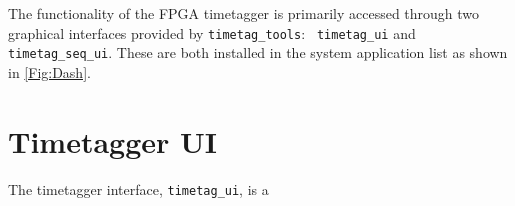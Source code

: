 The functionality of the FPGA timetagger is primarily accessed through
two graphical interfaces provided by {\tt timetag\_tools}: {\tt
 timetag\_ui} and {\tt timetag\_seq\_ui}. These are both installed in
the system application list as shown in \ref{Fig:Dash}.

\section{Timetagger UI}

The timetagger interface, {\tt timetag\_ui}, is a 
